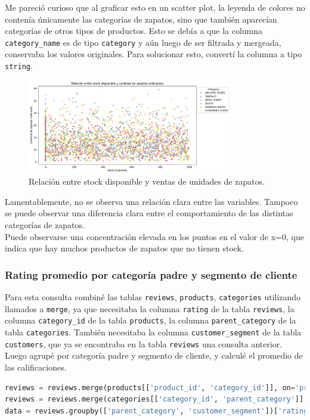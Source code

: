 Me pareció curioso que al graficar esto en un scatter plot, la leyenda de colores no contenía únicamente las categorías de zapatos, sino que también aparecían categorías de otros tipos de productos. Esto se debía a que la columna \texttt{category\_name} es de tipo \texttt{category} y aún luego de ser filtrada y mergeada, conservaba los valores originales. Para solucionar esto, convertí la columna a tipo \texttt{string}.

\begin{figure}[H]
    \centering
    \includegraphics[width=0.8\textwidth]{imagenes/consultas_propias/stock_zapatos.png}
    \caption{Relación entre stock disponible y ventas de unidades de zapatos.}
    \label{fig:stock_vs_ventas}
\end{figure}

Lamentablemente, no se observa una relación clara entre las variables. Tampoco se puede observar una diferencia clara entre el comportamiento de las distintas categorías de zapatos.\\
Puede observarse una concentración elevada en los puntos en el valor de x=0, que indica que hay muchos productos de zapatos que no tienen stock.

\subsubsection{Rating promedio por categoría padre y segmento de cliente}

Para esta consulta combiné las tablas \texttt{reviews}, \texttt{products}, \texttt{categories} utilizando llamados a \texttt{merge}, ya que necesitaba la columna \texttt{rating} de la tabla \texttt{reviews}, la columna \texttt{category\_id} de la tabla \texttt{products}, la columna \texttt{parent\_category} de la tabla \texttt{categories}. También necesitaba la columna \texttt{customer\_segment} de la tabla \texttt{customers}, que ya se encontraba en la tabla \texttt{reviews} una consulta anterior.\\
Luego agrupé por categoría padre y segmento de cliente, y calculé el promedio de las calificaciones.
\begin{lstlisting}[language=Python, xleftmargin=20pt, xrightmargin=20pt]
reviews = reviews.merge(products[['product_id', 'category_id']], on='product_id', how='left')
reviews = reviews.merge(categories[['category_id', 'parent_category']], on='category_id', how='left')
data = reviews.groupby(['parent_category', 'customer_segment'])['rating'].mean().unstack()
\end{lstlisting}

